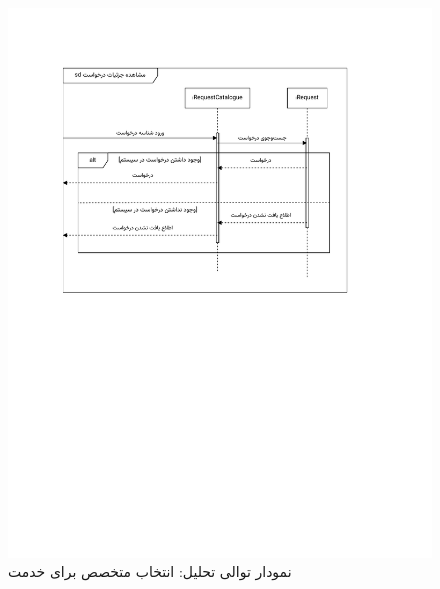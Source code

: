 \begin{figure}[ht!]
	\centering
	\includegraphics[scale=0.8, page=2]{figs/OOD-Sequence-2.pdf}
	\caption{نمودار توالی تحلیل: انتخاب متخصص برای خدمت}
\end{figure}
\FloatBarrier
\newpage

